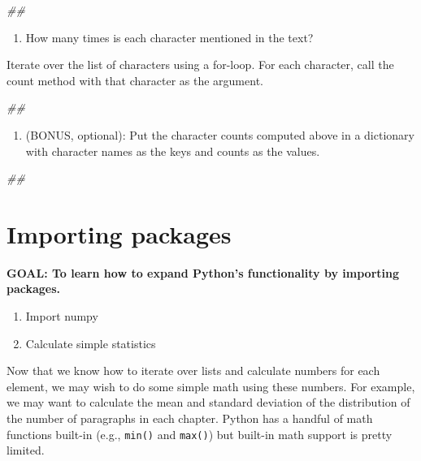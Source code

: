 \documentclass[]{book}
\newenvironment{Shaded}{\begin{snugshade}}{\end{snugshade}}
\newcommand{\CommentTok}[1]{\textcolor[rgb]{0.56,0.35,0.01}{\textit{#1}}}
\providecommand{\tightlist}{%
  \setlength{\itemsep}{0pt}\setlength{\parskip}{0pt}}
\begin{document}
\begin{Shaded}
\begin{Highlighting}[]
\CommentTok{##}
\end{Highlighting}
\end{Shaded}

\begin{enumerate}
\def\labelenumi{\arabic{enumi}.}
\setcounter{enumi}{2}
\tightlist
\item
  How many times is each character mentioned in the text?
\end{enumerate}

Iterate over the list of characters using a for-loop.
For each character, call the count method with that character as the argument.

\begin{Shaded}
\begin{Highlighting}[]
\CommentTok{##}
\end{Highlighting}
\end{Shaded}

\begin{enumerate}
\def\labelenumi{\arabic{enumi}.}
\setcounter{enumi}{3}
\tightlist
\item
  (BONUS, optional): Put the character counts computed
  above in a dictionary with character names as the keys and
  counts as the values.
\end{enumerate}

\begin{Shaded}
\begin{Highlighting}[]
\CommentTok{##}
\end{Highlighting}
\end{Shaded}

\hypertarget{importing-packages}{%
\section{Importing packages}\label{importing-packages}}

\textbf{GOAL: To learn how to expand Python's functionality by importing packages.}

\begin{enumerate}
\def\labelenumi{\arabic{enumi}.}
\tightlist
\item
  Import numpy
\item
  Calculate simple statistics
\end{enumerate}

Now that we know how to iterate over lists and calculate numbers for each element, we may wish to do some simple math using these numbers. For example, we may want to calculate the mean and standard deviation of the distribution of the number of paragraphs in each chapter. Python has a handful of math functions built-in (e.g., \texttt{min()} and \texttt{max()}) but built-in math support is pretty limited.
\end{document}
